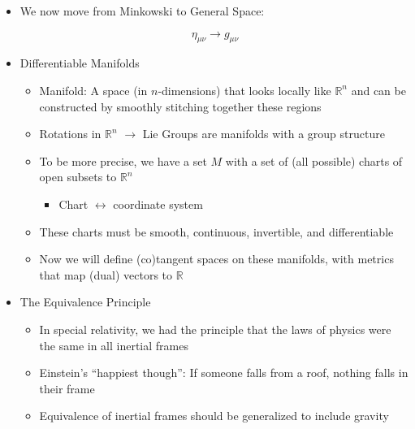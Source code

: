 \begin{itemize}

  \item We now move from Minkowski to General Space:

    $$\eta_{\mu\nu}\to g_{\mu\nu}$$

  \item Differentiable Manifolds

    \begin{itemize}

      \item Manifold: A space (in $n$-dimensions) that looks locally like $\mathbb{R}^n$ and can be constructed by smoothly stitching together these regions

      \item Rotations in $\mathbb{R}^n$ $\to$ Lie Groups are manifolds with a group structure

      \item To be more precise, we have a set $M$ with a set of (all possible) charts of open subsets to $\mathbb{R}^n$

        \begin{itemize}
            
          \item Chart $\leftrightarrow$ coordinate system

        \end{itemize}

      \item These charts must be smooth, continuous, invertible, and differentiable

      \item Now we will define (co)tangent spaces on these manifolds, with metrics that map (dual) vectors to $\mathbb{R}$

    \end{itemize}

  \item The Equivalence Principle

    \begin{itemize}

      \item In special relativity, we had the principle that the laws of physics were the same in all inertial frames

      \item Einstein's ``happiest though'': If someone falls from a roof, nothing falls in their frame

      \item Equivalence of inertial frames should be generalized to include gravity


\end{itemize}
\end{itemize}

